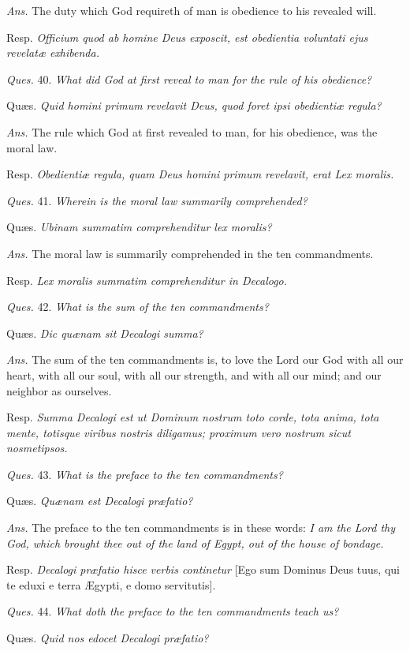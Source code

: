 \emph{Ans.} The duty which God requireth of man is obedience to his revealed will.

Resp. \emph{Officium quod ab homine Deus exposcit, est obedientia voluntati ejus revelatæ exhibenda.}

\emph{Ques.} 40. \emph{What did God at first reveal to man for the rule of his obedience?}

Quæs. \emph{Quid homini primum revelavit Deus, quod foret ipsi obedientiæ regula?}

\emph{Ans.} The rule which God at first revealed to man, for his obedience, was the moral law.

Resp. \emph{Obedientiæ regula, quam Deus homini primum revelavit, erat Lex moralis.}

\emph{Ques.} 41. \emph{Wherein is the moral law summarily comprehended?}

Quæs. \emph{Ubinam summatim comprehenditur lex moralis?}

\emph{Ans.} The moral law is summarily comprehended in the ten commandments.

Resp. \emph{Lex moralis summatim comprehenditur in Decalogo.}

\emph{Ques.} 42. \emph{What is the sum of the ten commandments?}

Quæs. \emph{Dic quænam sit Decalogi summa?}

\emph{Ans.} The sum of the ten commandments is, to love the Lord our God with all our heart, with all our soul, with all our strength, and with all our mind; and our neighbor as ourselves.

Resp. \emph{Summa Decalogi est ut Dominum nostrum toto corde, tota anima, tota mente, totisque viribus nostris diligamus; proximum vero nostrum sicut nosmetipsos.}

\emph{Ques.} 43. \emph{What is the preface to the ten commandments?}

Quæs. \emph{Quænam est Decalogi præfatio?}

\emph{Ans.} The preface to the ten commandments is in these words: \emph{I am the Lord thy God, which brought thee out of the land of Egypt, out of the house of bondage.}

Resp. \emph{Decalogi præfatio hisce verbis continetur} [Ego sum Dominus Deus tuus, qui te eduxi e terra Ægypti, e domo servitutis].

\emph{Ques.} 44. \emph{What doth the preface to the ten commandments teach us?}

Quæs. \emph{Quid nos edocet Decalogi præfatio?}

